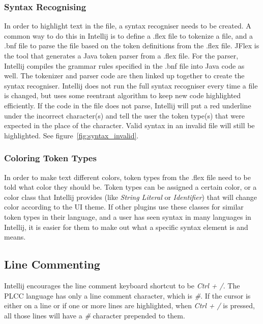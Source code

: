 \documentclass[conference, letterpaper]{IEEEtran}
\begin{document}
\subsubsection{Syntax Recognising}\label{subsubsec:syntax-recognising}
In order to highlight text in the file, a syntax recogniser needs to be created.
A common way to do this in Intellij is to define a .flex file to tokenize a file, and a .bnf file to parse the file based on the token definitions from the .flex file.
JFlex is the tool that generates a Java token parser from a .flex file.
For the parser, Intellij compiles the grammar rules specified in the .bnf file into Java code as well.
The tokenizer and parser code are then linked up together to create the syntax recogniser.
Intellij does not run the full syntax recogniser every time a file is changed, but uses some reentrant algorithm to keep new code highlighted efficiently.
If the code in the file does not parse, Intellij will put a red underline under the incorrect character(s) and tell the user the token type(s) that were expected in the place of the character.
Valid syntax in an invalid file will still be highlighted.
See figure~\ref{fig:syntax_invalid}.

\subsubsection{Coloring Token Types}\label{subsubsec:coloring-token-types}
In order to make text different colors, token types from the .flex file need to be told what color they should be.
Token types can be assigned a certain color, or a color class that Intellij provides (like \textit{String Literal} or \textit{Identifier}) that will change color according to the UI theme.
If other plugins use these classes for similar token types in their language, and a user has seen syntax in many languages in Intellij, it is easier for them to make out what a specific syntax element is and means.

\subsection{Line Commenting}\label{subsec:line-commenting}
Intellij encourages the line comment keyboard shortcut to be \textit{Ctrl + /}.
The PLCC language has only a line comment character, which is \textit{\#}.
If the cursor is either on a line or if one or more lines are highlighted, when \textit{Ctrl + /} is pressed, all those lines will have a \textit{\#} character prepended to them.
\end{document}
